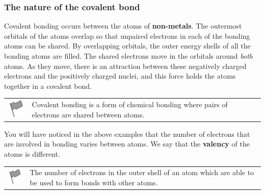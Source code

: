             \subsubsection{ The nature of the covalent bond}
            \nopagebreak
            
        
        \label{m38704*id138956}Covalent bonding occurs between the atoms of \textbf{non-metals}. The outermost orbitals of the atoms overlap so that unpaired electrons in each of the bonding atoms can be shared. By overlapping orbitals, the outer energy shells of all the bonding atoms are filled. The shared electrons move in the orbitals around \textsl{both} atoms. As they move, there is an attraction between these negatively charged electrons and the positively charged nuclei, and this force holds the atoms together in a covalent bond.\par 
\label{m38704*fhsst!!!underscore!!!id94}\begin{definition}
	  \begin{tabular*}{15 cm}{m{15 mm}m{}}
	\hspace*{-50pt}  \includegraphics[width=0.5in]{col11305.imgs/psflag2.png}   & \Definition{   \label{id2427171}\textbf{ Covalent bond }} { \label{m38704*meaningfhsst!!!underscore!!!id94}
        Covalent bonding is a form of chemical bonding where pairs of electrons are shared between atoms. 
         } 
      \end{tabular*}
      \end{definition}

        \label{m38704*id139505}You will have noticed in the above examples that the number of electrons that are involved in bonding varies between atoms. We say that the \textbf{valency} of the atoms is different.\par 
\label{m38704*fhsst!!!underscore!!!id165}\begin{definition}
	  \begin{tabular*}{15 cm}{m{15 mm}m{}}
	\hspace*{-50pt}  \includegraphics[width=0.5in]{col11305.imgs/psflag2.png}   & \Definition{   \label{id2427205}\textbf{ Valency }} { \label{m38704*meaningfhsst!!!underscore!!!id165}
        The number of electrons in the outer shell of an atom which are able to be used to form bonds with other atoms. 
         } 
      \end{tabular*}
      \end{definition}

